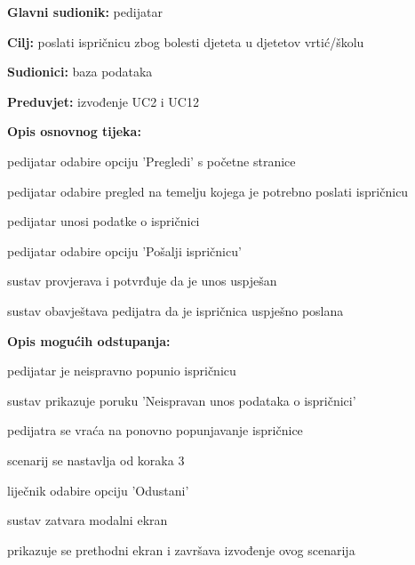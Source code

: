                     \noindent {}
					\begin{packed_item}
	
						\item \textbf{Glavni sudionik: }pedijatar
						\item  \textbf{Cilj:} poslati ispričnicu zbog bolesti djeteta u djetetov vrtić/školu
						\item  \textbf{Sudionici:} baza podataka
						\item  \textbf{Preduvjet:} izvođenje UC2 i UC12
						\item  \textbf{Opis osnovnog tijeka:}
						
						\item[] \begin{packed_enum}
	
							\item pedijatar odabire opciju 'Pregledi' s početne stranice
							\item pedijatar odabire pregled na temelju kojega je potrebno poslati ispričnicu
							\item pedijatar unosi podatke o ispričnici
                            \item pedijatar odabire opciju 'Pošalji ispričnicu'
                            \item sustav provjerava i potvrđuje da je unos uspješan
                            \item sustav obavještava pedijatra da je ispričnica uspješno poslana

						\end{packed_enum}
						
						\item  \textbf{Opis mogućih odstupanja:}
						
						\item[] \begin{packed_item}
	
                            \item[5.a] pedijatar je neispravno popunio ispričnicu
							\item[] \begin{packed_enum}
								\item sustav prikazuje poruku 'Neispravan unos podataka o ispričnici'
								\item pedijatra se vraća na ponovno popunjavanje ispričnice
								\item scenarij se nastavlja od koraka 3
							\end{packed_enum}

							\item[5.b] liječnik odabire opciju 'Odustani'
							\item [] \begin{packed_enum}
								\item sustav zatvara modalni ekran
								\item prikazuje se prethodni ekran i završava izvođenje ovog scenarija
							\end{packed_enum}
							
						\end{packed_item}
					\end{packed_item}

